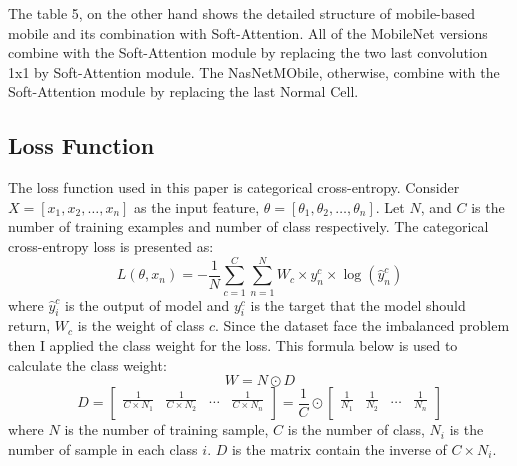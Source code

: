 \documentclass[sensors,article,submit,pdftex,moreauthors]{Definitions/mdpi}
\begin{document}
The table 5, on the other hand shows the detailed structure of mobile-based mobile and its combination with Soft-Attention. All of the MobileNet versions combine with the Soft-Attention module by replacing the two last convolution 1x1 by Soft-Attention module. The NasNetMObile, otherwise, combine with the Soft-Attention module by replacing the last Normal Cell.

\subsection{Loss Function}
The loss function used in this paper is categorical cross-entropy. Consider $X = [x_1, x_2, \dots, x_n]$ as the input feature, $\theta = [\theta_1, \theta_2, \dots, \theta_n]$. Let $N$, and $C$ is the number of training examples and number of class respectively. The categorical cross-entropy loss is presented as:
\[L(\theta, x_n) = -\frac{1}{N}\sum_{c=1}^{C}\sum_{n=1}^{N}W_c\times y^c_n \times \log(\hat{y}^c_n)\]
where $\hat{y}^c_i$  is the output of model and $y^c_i$ is the target that the model should return, $W_c$ is the weight of class $c$. Since the dataset face the imbalanced problem then I applied the class weight for the loss. This formula below is used to calculate the class weight:
\[W = N \odot D\]
\[D = \begin{bmatrix}
	\frac{1}{C \times  N_1} & \frac{1}{C \times  N_2} & \dots & \frac{1}{C \times  N_n}\\
\end{bmatrix} = \frac{1}{C} \odot \begin{bmatrix}
	\frac{1}{N_1} & \frac{1}{N_2} & \dots & \frac{1}{N_n}\\
\end{bmatrix}\]
where $N$ is the number of training sample, $C$ is the number of class, $N_i$ is the number of sample in each class $i$. $D$ is the matrix contain the inverse of $C \times N_i$. 
\end{document}
